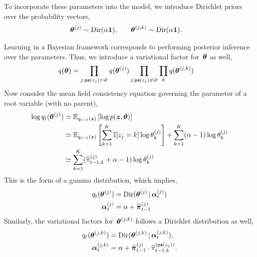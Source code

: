 To incorporate these parameters into the model, we introduce Dirichlet priors
over the probability vectors,
\begin{align}
  \boldsymbol{\theta}^{(j)} &\sim \mathrm{Dir}(\alpha \boldsymbol{1}), & & &
  \boldsymbol{\theta}^{(j,k)} &\sim \mathrm{Dir}(\alpha \boldsymbol{1}).
\end{align}

Learning in a Bayesian framework corresponds to performing posterior
inference over the parameters. Thus, we introduce a variational factor
for~$\boldsymbol{\theta}$ as well,
\begin{align}
  q(\boldsymbol{\theta}) &=
  \prod_{j: \mathsf{pa}(z_j)=\varnothing} q(\boldsymbol{\theta}^{(j)})
  \prod_{j: \mathsf{pa}(z_j)\neq \varnothing} \prod_{k} q(\boldsymbol{\theta}^{(j,k)})
\end{align}
Now consider the mean field consistency equation governing the parameter
of a root variable (with no parent),
\begin{align}
  \log q_t(\boldsymbol{\theta}^{(j)}) &\simeq
  \mathbb{E}_{q_{t-1}(\boldsymbol{z})}\left[ \log p(\boldsymbol{z}, \boldsymbol{\theta}) \right] \\
  &\simeq \mathbb{E}_{q_{t-1}(\boldsymbol{z})}
  \left[ \sum_{k=1}^K \mathbb{I}[z_j=k] \log \theta_k^{(j)} \right]
  + \sum_{k=1}^K (\alpha-1) \log \theta_k^{(j)}  \\
  &\simeq  \sum_{k=1}^K (\widehat{\pi}_{t-1,k}^{(j)} + \alpha-1) \log \theta_k^{(j)}
\end{align}
This is the form of a gamma distribution, which implies,
\begin{align}
  q_t(\boldsymbol{\theta}^{(j)})
  &= \mathrm{Dir}(\boldsymbol{\theta}^{(j)} \,|\,  \boldsymbol{\alpha}_{t}^{(j)}) \\
  \boldsymbol{\alpha}_{t}^{(j)} &= \alpha + \widehat{\boldsymbol{\pi}}_{t-1}^{(j)}
\end{align}
Similarly, the variational factors for~$\boldsymbol{\theta}^{(j,k)}$
follows a Dirichlet distribution as well,
\begin{align}
  q_t(\boldsymbol{\theta}^{(j,k)}) &=
  \mathrm{Dir}(\boldsymbol{\theta}^{(j,k)} \,|\, \boldsymbol{\alpha}_{t}^{(j,k)}), \\
  \boldsymbol{\alpha}_{t}^{(j,k)} &= \alpha + \widehat{\boldsymbol{\pi}}_{t-1}^{(j)} \cdot \widehat{\pi}_{t-1,k}^{(\mathsf{pa}(z_j))}.
\end{align}


